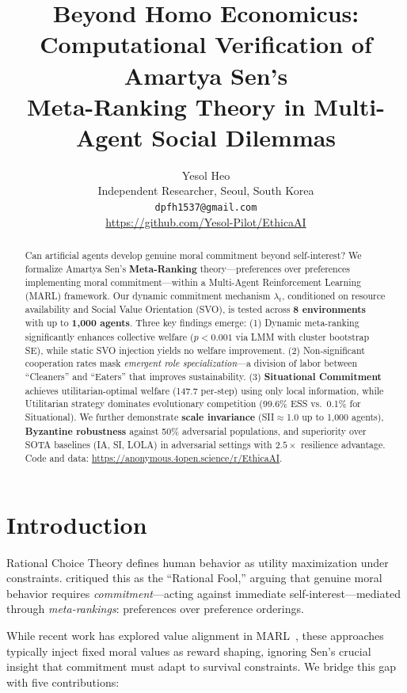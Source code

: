 \documentclass{article}
\title{Beyond Homo Economicus: Computational Verification of Amartya Sen's\\
Meta-Ranking Theory in Multi-Agent Social Dilemmas}
\author{
  Yesol Heo \\
  Independent Researcher, Seoul, South Korea \\
  \texttt{dpfh1537@gmail.com} \\
  \url{https://github.com/Yesol-Pilot/EthicaAI}
}
\begin{document}
\maketitle

\begin{abstract}
Can artificial agents develop genuine moral commitment beyond self-interest?
We formalize Amartya Sen's \textbf{Meta-Ranking} theory---preferences over preferences implementing moral commitment---within a Multi-Agent Reinforcement Learning (MARL) framework.
Our dynamic commitment mechanism $\lambda_t$, conditioned on resource availability and Social Value Orientation (SVO), is tested across \textbf{8 environments} with up to \textbf{1,000 agents}.
Three key findings emerge:
(1) Dynamic meta-ranking significantly enhances collective welfare ($p{<}0.001$ via LMM with cluster bootstrap SE), while static SVO injection yields no welfare improvement.
(2) Non-significant cooperation rates mask \emph{emergent role specialization}---a division of labor between ``Cleaners'' and ``Eaters'' that improves sustainability.
(3) \textbf{Situational Commitment} achieves utilitarian-optimal welfare (147.7 per-step) using only local information, while Utilitarian strategy dominates evolutionary competition (99.6\% ESS vs.\ 0.1\% for Situational).
We further demonstrate \textbf{scale invariance} (SII$\approx$1.0 up to 1,000 agents), \textbf{Byzantine robustness} against 50\% adversarial populations, and superiority over SOTA baselines (IA, SI, LOLA) in adversarial settings with $2.5\times$ resilience advantage.
Code and data: \url{https://anonymous.4open.science/r/EthicaAI}.
\end{abstract}

\section{Introduction}

Rational Choice Theory defines human behavior as utility maximization under constraints.
\citet{sen1977rational} critiqued this as the ``Rational Fool,'' arguing that genuine moral behavior requires \textit{commitment}---acting against immediate self-interest---mediated through \textit{meta-rankings}: preferences over preference orderings.

While recent work has explored value alignment in MARL~\citep{rodriguez2021multi,christoffersen2023get}, these approaches typically inject fixed moral values as reward shaping, ignoring Sen's crucial insight that commitment must adapt to survival constraints.
We bridge this gap with five contributions:
\end{document}
